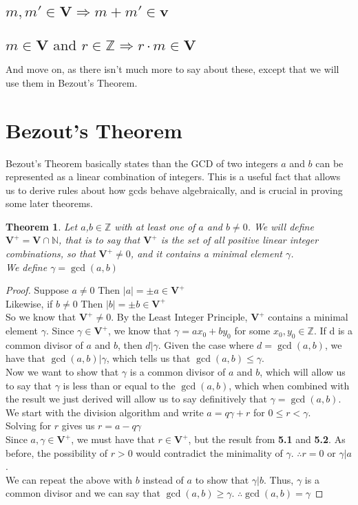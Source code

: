 \documentclass[10pt]{article}
\newcommand{\N}{\mathbb{N}}
\newcommand{\Z}{\mathbb{Z}}
\newtheorem{theorem}{Theorem}
\theoremstyle{definition}
\theoremstyle{remark}
\def\Z{\mathbb{ Z}}
\def\N{\mathbb{N}}
\def\ra{\Rightarrow}
\newcommand{\mb}[1]{\mathbf{#1}}
\begin{document}
\subsection{$m,m'\in \mb{V} \ra m+m' \in \mb{v}$}
\subsection{$m\in \mb{V} \text{ and } r\in\Z \ra r\cdot m \in \mb{V}$}

And move on, as there isn't much more to say about these, except that we will use them in Bezout's Theorem.
\pagebreak
\section{Bezout's Theorem}
Bezout's Theorem basically states than the GCD of two integers $a$ and $b$ can be represented as a linear combination of integers.  This is a useful fact that allows us to derive rules about how gcds behave algebraically, and is crucial in proving some later theorems.
\begin{theorem}\label{Bezout's Theorem}
Let $a$,$b\in\Z$ with at least one of $a$ and $b\neq0$.  We will define $\mb{V}^+=\mb{V}\cap\N$, that is to say that $\mb{V}^+$ is the set of all positive linear integer combinations, so that $\mb{V}^+\neq0$, and it contains a minimal element $\gamma$.\\
We define $\gamma = \gcd(a,b)$
\end{theorem}

\begin{proof}\label{Bezout}
Suppose $a\neq 0$ Then $|a|=\pm a \in \mb{V}^+$\\
Likewise, if $b\neq 0$ Then $|b|=\pm b \in \mb{V}^+$\\
So we know that $\mb{V}^+\neq0$.  By the Least Integer Principle, $\mb{V}^+$ contains a minimal element $\gamma$.  Since $\gamma \in \mb{V}^+$, we know that $\gamma = ax_0 + by_0$ for some $x_0,y_0 \in \Z$.  If d is a common divisor of $a$ and $b$, then $d|\gamma$.  Given the case where $d=\gcd(a,b)$, we have that $\gcd(a,b)|\gamma$, which tells us that $\gcd(a,b) \leq \gamma$.\\
Now we want to show that $\gamma$ is a common divisor of $a$ and $b$, which will allow us to say that $\gamma$ is less than or equal to the $\gcd(a,b)$, which when combined with the result we just derived will allow us to say definitively that $\gamma = \gcd(a,b)$.\\
We start with the division algorithm and write $a = q\gamma + r$ for $0 \leq r < \gamma$.\\
Solving for $r$ gives us $r = a-q\gamma$\\
Since $a,\gamma \in \mb{V}^+$, we must have that $r\in \mb{V}^+$, but the result from \textbf{5.1} and \textbf{5.2}.  As before, the possibility of $r>0$ would contradict the minimality of $\gamma$.  $\therefore r=0$ or $\gamma|a$.\\
We can repeat the above with $b$ instead of $a$ to show that $\gamma|b$.  Thus, $\gamma$ is a common divisor and we can say that $\gcd(a,b)\geq \gamma$.
$\therefore \gcd(a,b) = \gamma$
\end{proof}
\end{document}

